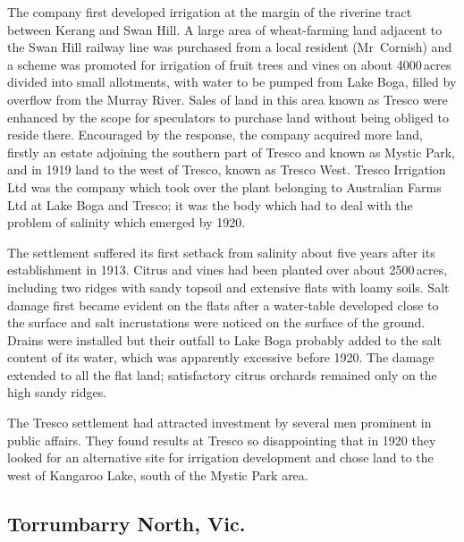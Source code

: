 The company first developed irrigation at the margin of the riverine
tract between Kerang and Swan Hill.  A large area of wheat-farming
land adjacent to the Swan Hill railway line was purchased from a local
resident (Mr~Cornish) and a scheme was promoted for irrigation of
fruit trees and vines on about 4000\,acres divided into small
allotments, with water to be pumped from Lake Boga, 
filled by overflow from the Murray River.  Sales of land in this area
known as Tresco were enhanced by the scope for speculators to purchase
land without being obliged to reside there.  Encouraged by the
response, the company acquired more land, firstly an estate adjoining
the southern part of Tresco and known as Mystic Park, and in 1919 land
to the west of Tresco, known as Tresco West.  Tresco Irrigation Ltd
was the company which took over the plant belonging to Australian
Farms Ltd at Lake Boga and Tresco; it was the body which had to deal
with the problem of salinity which emerged by
1920.

The settlement suffered its first setback from salinity about five
years after its establishment in 1913.  Citrus and vines had been
planted over about 2500\,acres, including two ridges with sandy
topsoil and extensive flats with loamy soils.  Salt damage
 first became evident on the flats after a water-table
developed close to the surface and salt incrustations were noticed on
the surface of the ground.  Drains were installed but their outfall to
Lake Boga probably added to the salt content of its water, which was
apparently excessive before 1920. The damage extended to all the flat
land; satisfactory citrus orchards remained only on the high sandy
ridges.

The Tresco settlement had attracted investment by several men
pro\-minent in public affairs.  They found results at Tresco so
disappointing that in 1920 they looked for an alternative site for
irrigation development and chose land to the west of Kangaroo Lake,
south of the Mystic Park area.

\subsection*{Torrumbarry North, Vic.}


